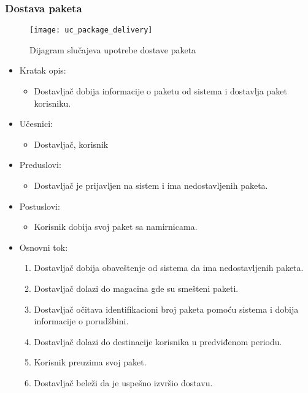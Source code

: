 
\subsubsection{Dostava paketa}
\begin{figure}[H]
	\begin{center}
		\texttt{[image: uc\_package\_delivery]}
	\end{center}
	\caption{Dijagram slučajeva upotrebe dostave paketa}
\end{figure}

	\begin{itemize}
		\item{Kratak opis:} 
		\begin{itemize}
			\item{Dostavljač dobija informacije o paketu od sistema i dostavlja paket korisniku.}
		\end{itemize}
		
		\item{Učesnici:} 
		\begin{itemize}
			\item{Dostavljač, korisnik}
		\end{itemize}		
		
		\item{Preduslovi:}
		\begin{itemize}
			\item{Dostavljač je prijavljen na sistem i ima nedostavljenih paketa. }
		\end{itemize}		

		\item{Postuslovi:}
		\begin{itemize}
			\item{Korisnik dobija svoj paket sa namirnicama.}
		\end{itemize}		
		
		\item{Osnovni tok:}
		\begin{enumerate}
			\item{Dostavljač dobija obaveštenje od sistema da ima nedostavljenih paketa.}
			\item{Dostavljač dolazi do magacina gde su smešteni paketi.}
			\item{Dostavljač očitava identifikacioni broj paketa pomoću sistema i dobija informacije o porudžbini.}
			\item{Dostavljač dolazi do destinacije korisnika u predviđenom periodu.}
			\item{Korisnik preuzima svoj paket.}
			\item{Dostavljač beleži da je uspešno izvršio dostavu.}


\end{enumerate}
\end{itemize}
